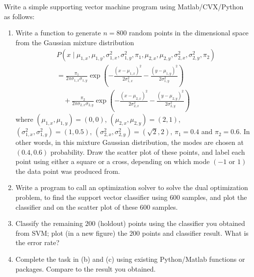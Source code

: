 \documentclass[11pt]{article}
\begin{document}
\begin{homeworkProblem}

    Write a simple supporting vector machine program using Matlab/CVX/Python as follows:
    \begin{enumerate}[label=(\alph*), topsep=5pt, itemsep=5pt]
        \item Write a function to generate $n = 800$ random points in the dimensional space from the
              Gaussian mixture distribution
              \begin{align*}
                   & P\left(x \mid \mu_{1, x}, \mu_{1, y}, \sigma_{1, x}^2, \sigma_{1, y}^2, \pi_1, \mu_{2, x}, \mu_{2, y}, \sigma_{2, x}^2, \sigma_{2, y}^2, \pi_2\right)                                \\
                   & =\frac{\pi_1}{2 \pi \sigma_{1, x} \sigma_{1, y}} \exp \left(-\frac{\left(x-\mu_{1, x}\right)^2}{2 \sigma_{1, x}^2}-\frac{\left(y-\mu_{1, y}\right)^2}{2 \sigma_{1, y}^2}\right)      \\
                   & \quad+\frac{\pi_2}{2 \pi \sigma_{2, x} \sigma_{2, y}} \exp \left(-\frac{\left(x-\mu_{2, x}\right)^2}{2 \sigma_{2, x}^2}-\frac{\left(y-\mu_{2, y}\right)^2}{2 \sigma_{2, y}^2}\right)
              \end{align*}
              where $(\mu_{1, x}, \mu_{1, y})=(0,0)$, $(\mu_{2, x}, \mu_{2, y})=(2,1)$, $(\sigma_{1, x}^2, \sigma_{1, y}^2)=(1,0.5)$, $(\sigma_{2, x}^2, \sigma_{2, y}^2)= (\sqrt{2}, 2)$, $\pi_1=0.4$ and $\pi_2=0.6$.
              In other words, in this mixture Gaussian distribution, the modes are chosen at $(0.4, 0.6)$ probability. Draw the scatter plot of these points, and
              label each point using either a square or a cross, depending on which mode $(-1 \text{ or } 1)$ the data point was produced from.
        \item Write a program to call an optimization solver to solve the dual optimization problem,
              to find the support vector classifier using $600$ samples, and plot the classifier and on the
              scatter plot of these $600$ samples.
        \item Classify the remaining $200$ (holdout) points using the classifier you obtained from SVM;
              plot (in a new figure) the $200$ points and classifier result. What is the error rate?
        \item Complete the task in (b) and (c) using existing Python/Matlab functions or packages.
              Compare to the result you obtained. \newline
    \end{enumerate}
    \solution


\end{homeworkProblem}
\end{document}
